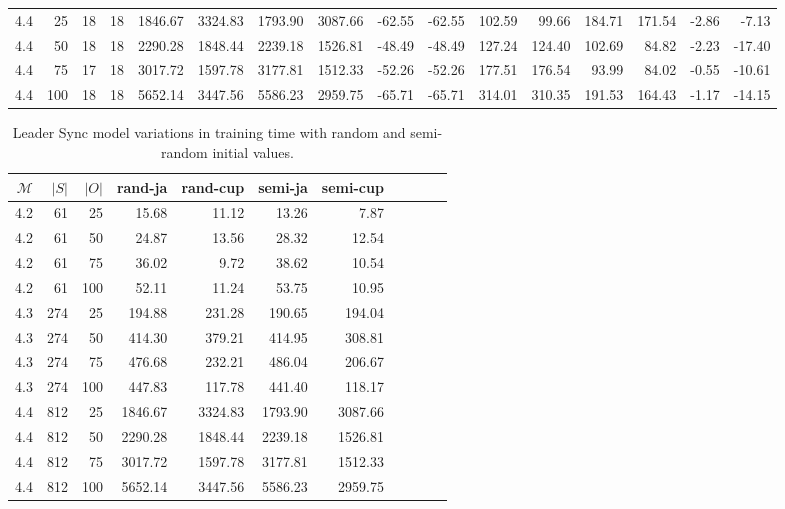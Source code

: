 \begin{table*}
\begin{tabular}{rrrrrrrrrrrrrrrr}
        4.4           & 25    & 18    & 18     & 1846.67  & 3324.83   & 1793.90   & 3087.66    & -62.55     & -62.55      & 102.59     & 99.66       & 184.71      & 171.54       & -2.86     & -7.13      \\
        4.4           & 50    & 18    & 18     & 2290.28  & 1848.44   & 2239.18   & 1526.81    & -48.49     & -48.49      & 127.24     & 124.40      & 102.69      & 84.82        & -2.23     & -17.40     \\
        4.4           & 75    & 17    & 18     & 3017.72  & 1597.78   & 3177.81   & 1512.33    & -52.26     & -52.26      & 177.51     & 176.54      & 93.99       & 84.02        & -0.55     & -10.61     \\
        4.4           & 100   & 18    & 18     & 5652.14  & 3447.56   & 5586.23   & 2959.75    & -65.71     & -65.71      & 314.01     & 310.35      & 191.53      & 164.43       & -1.17     & -14.15     \\
        \bottomrule
    \end{tabular}
\end{table*}

\begin{table}
    \centering
    \caption{Leader Sync model variations in training time with random and semi-random initial values.}
    \label{tab:leader_results_rand_vs_semi}
    \begin{tabular}{rrrrrrrrrrr}
        \toprule
        $\mathcal{M}$ & $|S|$ & $|O|$ & rand-ja & rand-cup & semi-ja & semi-cup \\
        \midrule
        4.2           & 61    & 25    & 15.68   & 11.12    & 13.26   & 7.87     \\
        4.2           & 61    & 50    & 24.87   & 13.56    & 28.32   & 12.54    \\
        4.2           & 61    & 75    & 36.02   & 9.72     & 38.62   & 10.54    \\
        4.2           & 61    & 100   & 52.11   & 11.24    & 53.75   & 10.95    \\
        4.3           & 274   & 25    & 194.88  & 231.28   & 190.65  & 194.04   \\
        4.3           & 274   & 50    & 414.30  & 379.21   & 414.95  & 308.81   \\
        4.3           & 274   & 75    & 476.68  & 232.21   & 486.04  & 206.67   \\
        4.3           & 274   & 100   & 447.83  & 117.78   & 441.40  & 118.17   \\
        4.4           & 812   & 25    & 1846.67 & 3324.83  & 1793.90 & 3087.66  \\
        4.4           & 812   & 50    & 2290.28 & 1848.44  & 2239.18 & 1526.81  \\
        4.4           & 812   & 75    & 3017.72 & 1597.78  & 3177.81 & 1512.33  \\
        4.4           & 812   & 100   & 5652.14 & 3447.56  & 5586.23 & 2959.75  \\
        \bottomrule
    \end{tabular}
\end{table}

